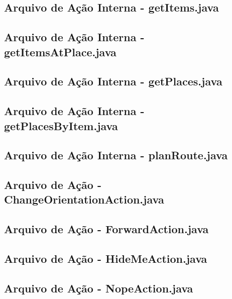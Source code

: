 \subsection*{Arquivo de Ação Interna - getItems.java}


\subsection*{Arquivo de Ação Interna - getItemsAtPlace.java}


\subsection*{Arquivo de Ação Interna - getPlaces.java}


\subsection*{Arquivo de Ação Interna - getPlacesByItem.java}


\subsection*{Arquivo de Ação Interna - planRoute.java}


\subsection*{Arquivo de Ação - ChangeOrientationAction.java}


\subsection*{Arquivo de Ação - ForwardAction.java}


\subsection*{Arquivo de Ação - HideMeAction.java}


\subsection*{Arquivo de Ação - NopeAction.java}


